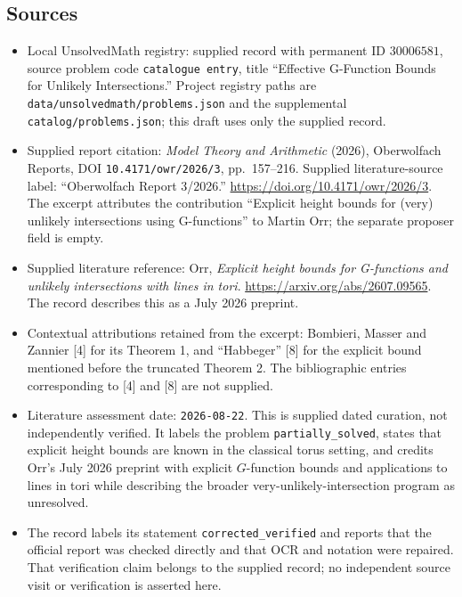 \documentclass[11pt]{article}
\begin{document}
\subsection{Sources}
\begin{itemize}
\item Local UnsolvedMath registry: supplied record with permanent ID \(30006581\), source problem code \texttt{catalogue entry}, title ``Effective G-Function Bounds for Unlikely Intersections.'' Project registry paths are \texttt{data/unsolvedmath/problems.json} and the supplemental \texttt{catalog/problems.json}; this draft uses only the supplied record.
\item Supplied report citation: \emph{Model Theory and Arithmetic} (2026), Oberwolfach Reports, DOI \texttt{10.4171/owr/2026/3}, pp.~157--216. Supplied literature-source label: ``Oberwolfach Report 3/2026.'' \url{https://doi.org/10.4171/owr/2026/3}. The excerpt attributes the contribution ``Explicit height bounds for (very) unlikely intersections using G-functions'' to Martin Orr; the separate proposer field is empty.
\item Supplied literature reference: Orr, \emph{Explicit height bounds for G-functions and unlikely intersections with lines in tori}. \url{https://arxiv.org/abs/2607.09565}. The record describes this as a July 2026 preprint.
\item Contextual attributions retained from the excerpt: Bombieri, Masser and Zannier [4] for its Theorem 1, and ``Habbeger'' [8] for the explicit bound mentioned before the truncated Theorem 2. The bibliographic entries corresponding to [4] and [8] are not supplied.
\item Literature assessment date: \texttt{2026-08-22}. This is supplied dated curation, not independently verified. It labels the problem \texttt{partially\_solved}, states that explicit height bounds are known in the classical torus setting, and credits Orr's July 2026 preprint with explicit \(G\)-function bounds and applications to lines in tori while describing the broader very-unlikely-intersection program as unresolved.
\item The record labels its statement \texttt{corrected\_verified} and reports that the official report was checked directly and that OCR and notation were repaired. That verification claim belongs to the supplied record; no independent source visit or verification is asserted here.
\end{itemize}
\end{document}
